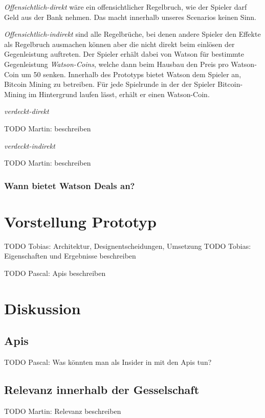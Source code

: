 \documentclass[german]{cgspaper} %
\newcommand{\Martin}[1]{ \textcolor{colorMartin}{TODO Martin:} #1 }
\newcommand{\Pascal}[1]{ \textcolor{colorPascal}{TODO Pascal:} #1 }
\newcommand{\Tobias}[1]{ \textcolor{colorTobias}{TODO Tobias:} #1 }
\newcommand{\neuerBegriff}[1]{\textit{#1}}
\begin{document}
\neuerBegriff{Offensichtlich-direkt} wäre ein offensichtlicher Regelbruch, wie der Spieler darf Geld aus der Bank nehmen. 
Das macht innerhalb unseres Scenarios keinen Sinn.

\neuerBegriff{Offensichtlich-indirekt} sind alle Regelbrüche, bei denen andere Spieler den Effekte als Regelbruch ausmachen können aber die nicht direkt beim einlösen der Gegenleistung auftreten.
Der Spieler erhält dabei von Watson für bestimmte Gegenleistung \neuerBegriff{Watson-Coins}, welche dann beim Hausbau den Preis pro Watson-Coin um 50 senken.
Innerhalb des Prototyps bietet Watson dem Spieler an, Bitcoin Mining zu betreiben.
Für jede Spielrunde in der der Spieler Bitcoin-Mining im Hintergrund laufen lässt, erhält er einen Watson-Coin.

\neuerBegriff{verdeckt-direkt}

\Martin{beschreiben}

\neuerBegriff{verdeckt-indirekt}

\Martin{beschreiben}

\subsubsection{Wann bietet Watson Deals an?}

\section{Vorstellung Prototyp}



\Tobias{Architektur, Designentscheidungen, Umsetzung}
\Tobias{Eigenschaften und Ergebnisse beschreiben}

\Pascal{Apis beschreiben}

\section{Diskussion}

\subsection{Apis}

\Pascal{Was könnten man als Insider in mit den Apis tun?}

\subsection{Relevanz innerhalb der Gesselschaft}

\Martin{Relevanz beschreiben}





\end{document}
